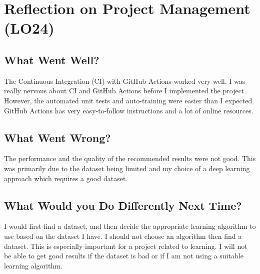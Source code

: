 \documentclass{article}
\begin{document}
\section{Reflection on Project Management (LO24)}


\subsection{What Went Well?} 
The Continuous Integration (CI) with GitHub Actions worked very well. I was really nervous about CI and GitHub Actions before I implemented the project. However, the automated unit tests and auto-training were easier than I expected. GitHub Actions has very easy-to-follow instructions and a lot of online resources.
\subsection{What Went Wrong?}
The performance and the quality of the recommended results were not good. This was primarily due to the dataset being limited and my choice of a deep learning approach which requires a good dataset.
\subsection{What Would you Do Differently Next Time?}
I would first find a dataset, and then decide the appropriate learning algorithm to use based on the dataset I have. I should not choose an algorithm then find a dataset. This is especially important for a project related to learning. I will not be able to get good results if the dataset is bad or if I am not using a suitable learning algorithm.
\end{document}
